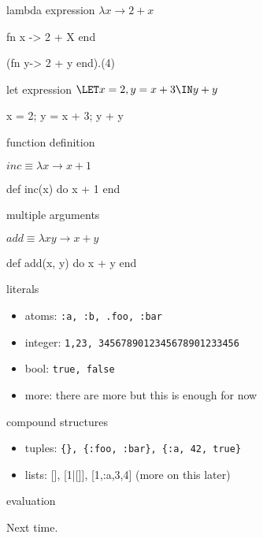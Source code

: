 \begin{frame}{lambda expression}
  $\lambda x \rightarrow 2 + x$
  \pause

  \begin{code}
   fn x -> 2 + X end
  \end{code}

  \begin{code}
    (fn y-> 2 + y end).(4)
  \end{code}
\end{frame}


\begin{frame}{let expression}
  $\LET x = 2, y = x + 3 \IN y + y $
  \pause

  \begin{code}
    x = 2;  y = x + 3;  y + y
  \end{code}
\end{frame}


\begin{frame}{function definition}

  $inc \equiv \lambda x \rightarrow x + 1$
  \pause

  \begin{code}
    def inc(x) do
       x + 1
    end 
  \end{code}

\end{frame}

\begin{frame}{multiple arguments}

  $add \equiv \lambda x y \rightarrow x + y$
  \pause

  \begin{code}
    def add(x, y) do
       x + y
    end
  \end{code}

\end{frame}

\begin{frame}{literals}
 \begin{itemize}
  \pause \item {atoms:} {\tt :a, :b, .foo, :bar}
  \pause \item {integer:} {\tt 1,23, 3456789012345678901233456}
  \pause \item {bool:} {\tt true, false}
  \pause \item {more:} there are more but this is enough for now
 \end{itemize}
\end{frame}


\begin{frame}{compound structures}
 \begin{itemize}
  \pause \item {tuples:} {\tt \{\}, \{:foo, :bar\}, \{:a, 42, true\}}
  \pause \item {lists:} [], [1|[]], [1,:a,3,4]  (more on this later)
 \end{itemize}
\end{frame}

\begin{frame}{evaluation}

\pause
\vspace{100pt}\hspace{100pt}Next time.

\end{frame}



